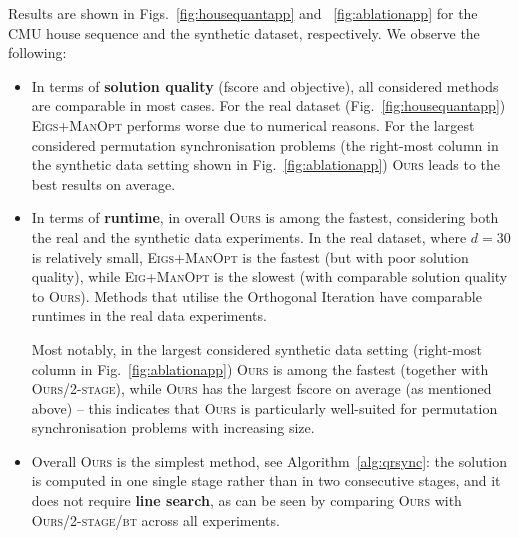 \documentclass{article}
\begin{document}
Results are shown in Figs.~\ref{fig:housequantapp} and ~\ref{fig:ablationapp} for the CMU house sequence and the synthetic dataset, respectively. We observe the following:
\begin{itemize}
    \item In terms of \textbf{solution quality} (fscore and objective), all considered methods are comparable in most cases. For the real dataset (Fig.~\ref{fig:housequantapp}) \textsc{Eigs+ManOpt} performs worse due to numerical reasons. For the largest considered permutation synchronisation problems (the right-most column in the synthetic data setting shown in Fig.~\ref{fig:ablationapp}) \textsc{Ours} leads to the best results on average.
    \item In terms of \textbf{runtime}, in overall \textsc{Ours} is among the fastest, considering both the real and the synthetic data experiments. In the real dataset, where $d=30$ is relatively small,
    \textsc{Eigs+ManOpt} is the fastest (but with poor solution quality), while \textsc{Eig+ManOpt} is the slowest (with comparable solution quality to \textsc{Ours}). 
    Methods that utilise the Orthogonal Iteration  have  comparable runtimes in the real data experiments. 
    
    Most notably, in the largest considered synthetic data setting (right-most column in Fig.~\ref{fig:ablationapp}) \textsc{Ours} is among the fastest (together with \textsc{Ours/2-stage}), while \textsc{Ours} has the largest fscore on average (as mentioned above) -- this indicates that \textsc{Ours} is particularly well-suited for permutation synchronisation problems with increasing size.
    \item Overall \textsc{Ours} is the simplest method, see Algorithm~\ref{alg:qrsync}: the solution is computed in one single stage rather than in two consecutive stages, and it does not require \textbf{line search}, as can be seen by comparing \textsc{Ours} with \textsc{Ours/2-stage/bt} across all experiments.
\end{itemize}


%

\end{document}
